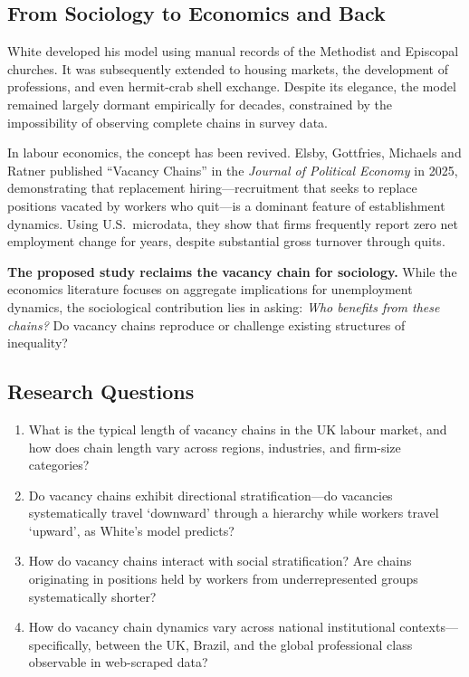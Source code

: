 \documentclass[a4paper]{tufte-handout}
\begin{document}
\subsection{From Sociology to Economics and Back}

White developed his model using manual records of the Methodist and Episcopal churches. It was subsequently extended to housing markets, the development of professions, and even hermit-crab shell exchange.
Despite its elegance, the model remained largely dormant empirically for decades, constrained by the impossibility of observing complete chains in survey data.

In labour economics, the concept has been revived. Elsby, Gottfries, Michaels and Ratner published ``Vacancy Chains'' in the \emph{Journal of Political Economy} in 2025,
demonstrating that replacement hiring---recruitment that seeks to replace positions vacated by workers who quit---is a dominant feature of establishment dynamics. Using U.S.\ microdata, they show that firms frequently report zero net employment change for years, despite substantial gross turnover through quits.

\medskip
\noindent
\textbf{The proposed study reclaims the vacancy chain for sociology.} While the economics literature focuses on aggregate implications for unemployment dynamics, the sociological contribution lies in asking: \emph{Who benefits from these chains?} Do vacancy chains reproduce or challenge existing structures of inequality?

\subsection{Research Questions}

\begin{enumerate}
  \item What is the typical length of vacancy chains in the UK labour market, and how does chain length vary across regions, industries, and firm-size categories?
  \item Do vacancy chains exhibit directional stratification---do vacancies systematically travel `downward' through a hierarchy while workers travel `upward', as White's model predicts?
  \item How do vacancy chains interact with social stratification? Are chains originating in positions held by workers from underrepresented groups systematically shorter?
  \item How do vacancy chain dynamics vary across national institutional contexts---specifically, between the UK, Brazil, and the global professional class observable in web-scraped data?
\end{enumerate}
\end{document}
